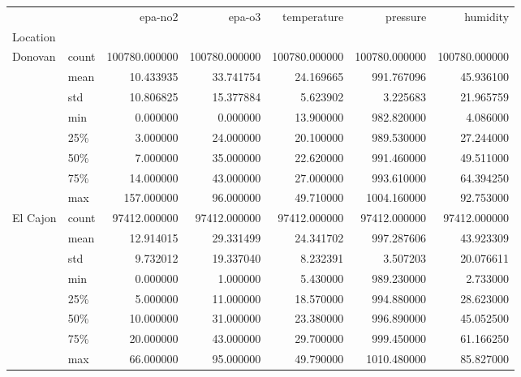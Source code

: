 \begin{tabular}{llrrrrr}
\toprule
        &       &        epa-no2 &         epa-o3 &    temperature &       pressure &       humidity \\
Location & {} &                &                &                &                &                \\
\midrule
Donovan & count &  100780.000000 &  100780.000000 &  100780.000000 &  100780.000000 &  100780.000000 \\
        & mean &      10.433935 &      33.741754 &      24.169665 &     991.767096 &      45.936100 \\
        & std &      10.806825 &      15.377884 &       5.623902 &       3.225683 &      21.965759 \\
        & min &       0.000000 &       0.000000 &      13.900000 &     982.820000 &       4.086000 \\
        & 25\% &       3.000000 &      24.000000 &      20.100000 &     989.530000 &      27.244000 \\
        & 50\% &       7.000000 &      35.000000 &      22.620000 &     991.460000 &      49.511000 \\
        & 75\% &      14.000000 &      43.000000 &      27.000000 &     993.610000 &      64.394250 \\
        & max &     157.000000 &      96.000000 &      49.710000 &    1004.160000 &      92.753000 \\
El Cajon & count &   97412.000000 &   97412.000000 &   97412.000000 &   97412.000000 &   97412.000000 \\
        & mean &      12.914015 &      29.331499 &      24.341702 &     997.287606 &      43.923309 \\
        & std &       9.732012 &      19.337040 &       8.232391 &       3.507203 &      20.076611 \\
        & min &       0.000000 &       1.000000 &       5.430000 &     989.230000 &       2.733000 \\
        & 25\% &       5.000000 &      11.000000 &      18.570000 &     994.880000 &      28.623000 \\
        & 50\% &      10.000000 &      31.000000 &      23.380000 &     996.890000 &      45.052500 \\
        & 75\% &      20.000000 &      43.000000 &      29.700000 &     999.450000 &      61.166250 \\
        & max &      66.000000 &      95.000000 &      49.790000 &    1010.480000 &      85.827000 \\

\end{tabular}
